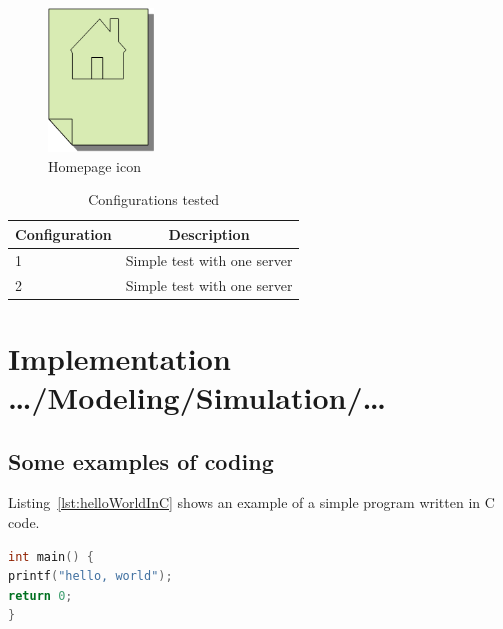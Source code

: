 \documentclass[english]{kththesis}
\begin{document}
\begin{figure}[!h]
  \begin{center}
    \includegraphics[width=0.25\textwidth]{Homepage-icon.png}
  \end{center}
  \caption{Homepage icon}
  \label{fig:homepageicon}
\end{figure}

\begin{table}[!ht]
  \begin{center}
    \caption{Configurations tested}
    \label{tab:configstested}
    \begin{tabular}{l|c} %
      \textbf{Configuration} & \textbf{Description} \\
      \hline
      1 & Simple test with one server\\
      2 & Simple test with one server\\
    \end{tabular}
  \end{center}
\end{table}

\section{Implementation …/Modeling/Simulation/…}
\label{sec:implementationDetails}

\subsection{Some examples of coding}

Listing~\ref{lst:helloWorldInC} shows an example of a simple program written
in C code.

\begin{lstlisting}[language={C}, caption={Hello world in C code}, label=lst:helloWorldInC]
int main() {
printf("hello, world");
return 0;
}
\end{lstlisting}
\end{document}
